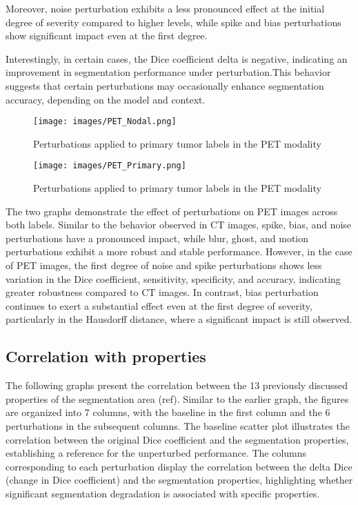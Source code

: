Moreover, noise perturbation exhibits a less pronounced effect at the initial degree of severity compared to higher levels, 
while spike and bias perturbations show significant impact even at the first degree. 

Interestingly, in certain cases, the Dice coefficient delta is negative, indicating an improvement in segmentation 
performance under perturbation.This behavior suggests that certain perturbations may occasionally enhance segmentation accuracy, 
depending on the model and context.
\newpage
\begin{figure}[ht]
    \centering
    \texttt{[image: images/PET\_Nodal.png]}
    \caption{Perturbations applied to primary tumor labels in the PET modality}
    \label{fig:three_subfigures}
\end{figure}
\begin{figure}[ht]
    \centering
    \texttt{[image: images/PET\_Primary.png]}
    \caption{Perturbations applied to primary tumor labels in the PET modality}
    \label{fig:three_subfigures}
\end{figure}
The two graphs demonstrate the effect of perturbations on PET images across both labels. 
Similar to the behavior observed in CT images, spike, bias, and noise perturbations have a pronounced impact, 
while blur, ghost, and motion perturbations exhibit a more robust and stable performance. However, 
in the case of PET images, the first degree of noise and spike perturbations shows less variation in the Dice coefficient, 
sensitivity, specificity, and accuracy, indicating greater robustness compared to CT images. In contrast, 
bias perturbation continues to exert a substantial effect even at the first degree of severity, particularly 
in the Hausdorff distance, where a significant impact is still observed.

\subsection{Correlation with properties}
The following graphs present the correlation between the 13 previously discussed properties of the segmentation area (ref{}). Similar to the earlier graph, the figures are organized into 7 columns, with the baseline in the first column and the 6 perturbations in the subsequent columns. The baseline scatter plot illustrates the correlation between the original Dice coefficient and the segmentation properties, establishing a reference for the unperturbed performance. The columns corresponding to each perturbation display the correlation between the delta Dice (change in Dice coefficient) and the segmentation properties, highlighting whether significant segmentation degradation is associated with specific properties.

